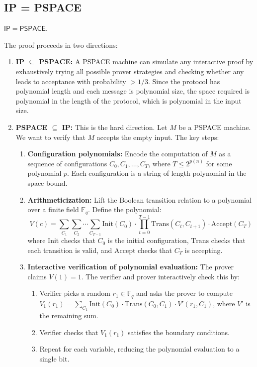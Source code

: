 \subsection{IP = PSPACE}

\begin{theorem}[Shamir 1992]
$\mathsf{IP} = \mathsf{PSPACE}$.
\end{theorem}

The proof proceeds in two directions:

\begin{enumerate}
\item \textbf{IP $\subseteq$ PSPACE:} A PSPACE machine can simulate any interactive proof by exhaustively trying all possible prover strategies and checking whether any leads to acceptance with probability $> 1/3$. Since the protocol has polynomial length and each message is polynomial size, the space required is polynomial in the length of the protocol, which is polynomial in the input size.

\item \textbf{PSPACE $\subseteq$ IP:} This is the hard direction. Let $M$ be a PSPACE machine. We want to verify that $M$ accepts the empty input. The key steps:
\begin{enumerate}
\item \textbf{Configuration polynomials:} Encode the computation of $M$ as a sequence of configurations $C_0, C_1, \ldots, C_T$, where $T \le 2^{p(n)}$ for some polynomial $p$. Each configuration is a string of length polynomial in the space bound.

\item \textbf{Arithmeticization:} Lift the Boolean transition relation to a polynomial over a finite field $\mathbb{F}_q$. Define the polynomial:
\[
V(c) = \sum_{C_1} \sum_{C_2} \cdots \sum_{C_{T-1}} \text{Init}(C_0) \cdot \prod_{t=0}^{T-1} \text{Trans}(C_t, C_{t+1}) \cdot \text{Accept}(C_T)
\]
where $\text{Init}$ checks that $C_0$ is the initial configuration, $\text{Trans}$ checks that each transition is valid, and $\text{Accept}$ checks that $C_T$ is accepting.

\item \textbf{Interactive verification of polynomial evaluation:} The prover claims $V(1) = 1$. The verifier and prover interactively check this by:
\begin{enumerate}
\item Verifier picks a random $r_1 \in \mathbb{F}_q$ and asks the prover to compute $V_1(r_1) = \sum_{C_1} \text{Init}(C_0) \cdot \text{Trans}(C_0, C_1) \cdot V'(r_1, C_1)$, where $V'$ is the remaining sum.
\item Verifier checks that $V_1(r_1)$ satisfies the boundary conditions.
\item Repeat for each variable, reducing the polynomial evaluation to a single bit.
\end{enumerate}


\end{enumerate}
\end{enumerate}
